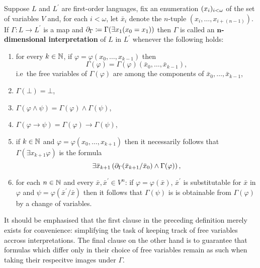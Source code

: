 \begin{dfn}[Interpretation]
	Suppose $L$ and $L^\prime$ are first-order languages, fix an enumeration $(x_i)_{i<\omega}$ of the set of variables $V$ and, for each $i<\omega$, let $\bar{x}_i$ denote the $n$-tuple $\left(x_i,\dotsc,x_{i+(n-1)}\right)$.  If $\Gamma\colon L\to L^\prime$ is a map and $\partial_\Gamma\coloneqq\Gamma(\exists x_1(x_0=x_1))$ then $\Gamma$ is called an $\mathbf{n}$\textbf{-dimensional interpretation} of $L$ in $L^\prime$ whenever the following holds:
	\begin{enumerate}
		\item	for every $k\in\mathbb{N}$, if $\varphi=\varphi(x_0,\dotsc,x_{k-1})$ then
		      \begin{equation}
			      \Gamma(\varphi)=\Gamma(\varphi)(\bar{x}_0,\dotsc,\bar{x}_{k-1}),
		      \end{equation}
		      i.e\ the free variables of $\Gamma(\varphi)$ are among the components of $\bar{x}_0,\dotsc,\bar{x}_{k-1}$,
		\item	$\Gamma(\bot)=\bot$,
		\item	$\Gamma(\varphi\wedge\psi)=\Gamma(\varphi)\wedge\Gamma(\psi)$,
		\item	$\Gamma(\varphi\rightarrow\psi)=\Gamma(\varphi)\rightarrow\Gamma(\psi)$,
		\item	if $k\in\mathbb{N}$ and $\varphi=\varphi(x_0,\dotsc,x_{k+1})$ then it necessarily follows that $\Gamma(\exists x_{k+1}\varphi)$ is the formula
		      \begin{equation}
			      \exists\bar{x}_{k+1}\left(\partial_\Gamma(\bar{x}_{k+1}/\bar{x}_0)\wedge\Gamma(\varphi)\right),
		      \end{equation}
		\item	for each $n\in\mathbb{N}$ and every $\bar{x},\bar{x}^\prime\in V^n$: if $\varphi=\varphi(\bar{x})$, $\bar{x}^\prime$ is substitutable for $\bar{x}$ in $\varphi$ and $\psi=\varphi(\bar{x}^\prime/\bar{x})$ then it follows that $\Gamma(\psi)$ is is obtainable from $\Gamma(\varphi)$ by a change of variables.
	\end{enumerate}
\end{dfn}

It should be emphasised that the first clause in the preceding definition merely
exists for convenience: simplifying the task of keeping track of free variables
accross interpretations.  The final clause on the other hand is to guarantee
that formulas which differ only in their choice of free variables remain as such
when taking their respecitve images under $\Gamma$.


